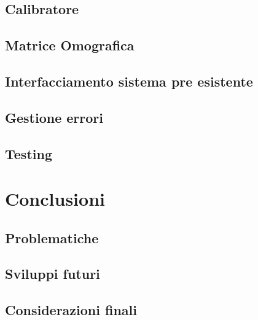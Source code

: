 \documentclass[twoside]{supsistudent}
\begin{document}
\section{Calibratore}

\section{Matrice Omografica}

\section{Interfacciamento sistema pre esistente}

\section{Gestione errori}

\section{Testing}

\chapter{Conclusioni}

\section{Problematiche}

\section{Sviluppi futuri}

\section{Considerazioni finali}



\end{document}
